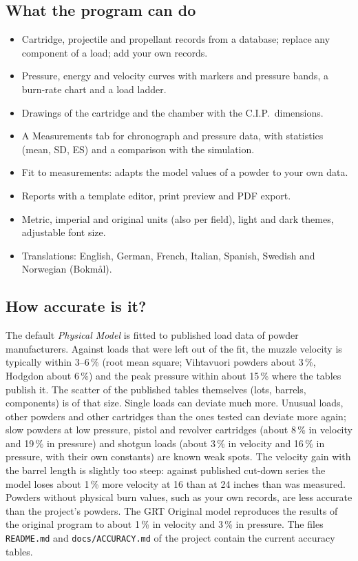 \documentclass[11pt,a4paper]{article}
\newcommand{\ui}[1]{\textsf{#1}}
\newcommand{\file}[1]{\texttt{#1}}
\begin{document}
\subsection{What the program can do}
\begin{itemize}
  \item Cartridge, projectile and propellant records from a database; replace any component of a load; add your own records.
  \item Pressure, energy and velocity curves with markers and pressure bands, a burn-rate chart and a load ladder.
  \item Drawings of the cartridge and the chamber with the C.I.P.\ dimensions.
  \item A \ui{Measurements} tab for chronograph and pressure data, with statistics (mean, SD, ES) and a comparison with the simulation.
  \item \ui{Fit to measurements}: adapts the model values of a powder to your own data.
  \item Reports with a template editor, print preview and PDF export.
  \item Metric, imperial and original units (also per field), light and dark themes, adjustable font size.
  \item Translations: English, German, French, Italian, Spanish, Swedish and Norwegian (Bokmål).
\end{itemize}

\subsection{How accurate is it?}
The default \emph{Physical Model} is fitted to published load data of powder manufacturers. Against loads that were left out of the
fit, the muzzle velocity is typically within 3--6\,\% (root mean square; Vihtavuori powders about 3\,\%, Hodgdon about 6\,\%) and the peak pressure
within about 15\,\% where the tables publish it. The scatter of the published tables themselves (lots, barrels, components) is of that size.
Single loads can deviate much more. Unusual loads, other powders and other cartridges than the ones tested can deviate more again; slow powders
at low pressure, pistol and revolver cartridges (about 8\,\% in velocity and 19\,\% in pressure) and shotgun loads (about 3\,\% in velocity and 16\,\%
in pressure, with their own constants) are known weak spots. The velocity gain with the barrel length is slightly too steep: against published cut-down series the model loses about 1\,\% more velocity at 16 than at 24 inches than was measured. Powders without physical burn values, such as your own records, are less accurate than
the project's powders. The \ui{GRT Original} model reproduces the results of the original program to about 1\,\% in velocity and 3\,\% in pressure.
The files \file{README.md} and \file{docs/ACCURACY.md} of the project contain the current accuracy tables.
\end{document}

